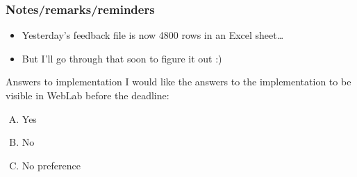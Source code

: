 

\begin{frame}
	\frametitle{Notes/remarks/reminders}
	\begin{itemize}
		\item Yesterday's feedback file is now 4800 rows in an Excel sheet\dots
		\item But I'll go through that soon to figure it out :)
	\end{itemize}
	\pause
	\begin{questionblock}{Answers to implementation}
		I would like the answers to the implementation to be visible in WebLab before the deadline:
		\begin{enumerate}[A.]
			\item Yes
			\item No
			\item No preference
		\end{enumerate}
	\end{questionblock}
\end{frame}
